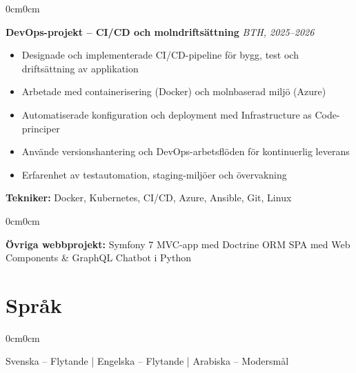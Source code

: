 \documentclass[10pt, letterpaper]{article}
\newenvironment{highlights}{
    \begin{itemize}[topsep=0.10cm, parsep=0.10cm, partopsep=0pt, itemsep=0pt, leftmargin=10pt]
}{
    \end{itemize}
}
\newenvironment{onecolentry}{
    \begin{adjustwidth}{0cm}{0cm}
}{
    \end{adjustwidth}
}
\begin{document}
    \vspace{0.2cm}

    \begin{onecolentry}
        \textbf{DevOps-projekt -- CI/CD och molndriftsättning} \hfill \textit{BTH, 2025--2026}
        \begin{highlights}
            \item Designade och implementerade CI/CD-pipeline för bygg, test och driftsättning av applikation
            \item Arbetade med containerisering (Docker) och molnbaserad miljö (Azure)
            \item Automatiserade konfiguration och deployment med Infrastructure as Code-principer
            \item Använde versionshantering och DevOps-arbetsflöden för kontinuerlig leverans
            \item Erfarenhet av testautomation, staging-miljöer och övervakning
        \end{highlights}
        \textbf{Tekniker:} Docker, Kubernetes, CI/CD, Azure, Ansible, Git, Linux
    \end{onecolentry}

    \vspace{0.2cm}

    \begin{onecolentry}
        \textbf{Övriga webbprojekt:} Symfony 7 MVC-app med Doctrine ORM \textbullet{} SPA med Web Components \& GraphQL \textbullet{} Chatbot i Python
    \end{onecolentry}

    \section{Språk}
    \begin{onecolentry}
        Svenska -- Flytande \quad | \quad Engelska -- Flytande \quad | \quad Arabiska -- Modersmål
    \end{onecolentry}
\end{document}

